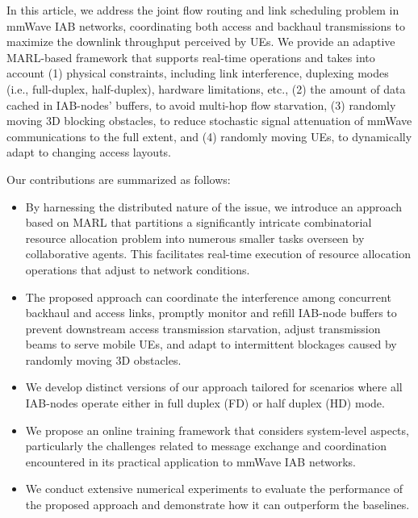 In this article, we address the joint flow routing and link scheduling problem in mmWave IAB networks, coordinating both access and backhaul transmissions to maximize the downlink throughput perceived by UEs.
We provide an adaptive MARL-based framework that supports real-time operations and takes into account (1) physical constraints, including link interference, duplexing modes (i.e., full-duplex, half-duplex), hardware limitations, etc., (2) the amount of data cached in IAB-nodes' buffers, to avoid multi-hop flow starvation, (3) randomly moving 3D blocking obstacles, to reduce stochastic signal attenuation of mmWave communications to the full extent, and (4) randomly moving UEs, to dynamically adapt to changing access layouts.

Our contributions are summarized as follows:
\begin{itemize}
    \item By harnessing the distributed nature of the issue, we introduce an approach based on MARL that partitions a significantly intricate combinatorial resource allocation problem into numerous smaller tasks overseen by collaborative agents. This facilitates real-time execution of resource allocation operations that adjust to network conditions.
	\item The proposed approach can coordinate the interference among concurrent backhaul and access links, promptly monitor and refill IAB-node buffers to prevent downstream access transmission starvation, adjust transmission beams to serve mobile UEs, and adapt to intermittent blockages caused by randomly moving 3D obstacles.
	\item We develop distinct versions of our approach tailored for scenarios where all IAB-nodes operate either in full duplex (FD) or half duplex (HD) mode.
        \item We propose an online training framework that considers system-level aspects, particularly the challenges related to message exchange and coordination encountered in its practical application to mmWave IAB networks.
        \item We conduct extensive numerical experiments to evaluate the performance of the proposed approach and demonstrate how it can outperform the baselines.
\end{itemize}

